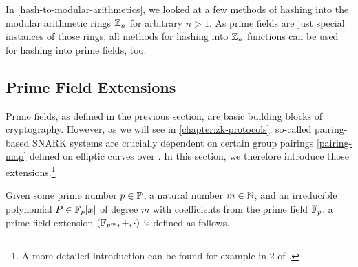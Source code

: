In \secname{} \ref{hash-to-modular-arithmetics}, we looked at a few methods of hashing into the modular arithmetic rings $\mathbb{Z}_n$ for arbitrary $n>1$. As prime fields are just special instances of those rings, all methods for hashing into $\mathbb{Z}_n$ functions can be used for hashing into prime fields, too.

\subsection{Prime Field Extensions}\label{field-extension}
Prime fields, as defined in the previous section, are basic building blocks of cryptography. However, as we will see in \chaptname{} \ref{chapter:zk-protocols}, so-called pairing-based SNARK systems are crucially dependent on certain group pairings \eqref{pairing-map} defined on elliptic curves over . In this section, we therefore introduce those extensions.\footnote{A more detailed introduction can be found for example in \chaptname{} 2 of \cite{nieder-1986}.}

Given some prime number $p\in \mathbb{P}$, a natural number $m\in\mathbb{N}$, and an irreducible polynomial $P\in \mathbb{F}_p[x]$ of degree $m$ with coefficients from the prime field $\mathbb{F}_p$,  a prime field extension $(\mathbb{F}_{p^m},+,\cdot)$ is defined as follows.

